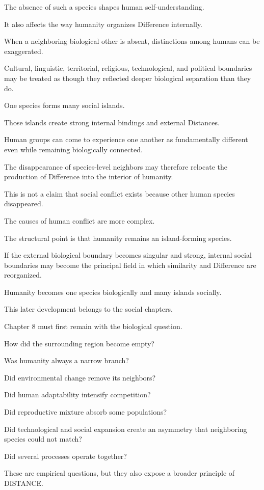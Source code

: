 The absence of such a species shapes human self-understanding.

It also affects the way humanity organizes Difference internally.

When a neighboring biological other is absent, distinctions among humans can be exaggerated.

Cultural, linguistic, territorial, religious, technological, and political boundaries may be treated as though they reflected deeper biological separation than they do.

One species forms many social islands.

Those islands create strong internal bindings and external Distances.

Human groups can come to experience one another as fundamentally different even while remaining biologically connected.

The disappearance of species-level neighbors may therefore relocate the production of Difference into the interior of humanity.

This is not a claim that social conflict exists because other human species disappeared.

The causes of human conflict are more complex.

The structural point is that humanity remains an island-forming species.

If the external biological boundary becomes singular and strong, internal social boundaries may become the principal field in which similarity and Difference are reorganized.

Humanity becomes one species biologically and many islands socially.

This later development belongs to the social chapters.

Chapter 8 must first remain with the biological question.

How did the surrounding region become empty?

Was humanity always a narrow branch?

Did environmental change remove its neighbors?

Did human adaptability intensify competition?

Did reproductive mixture absorb some populations?

Did technological and social expansion create an asymmetry that neighboring species could not match?

Did several processes operate together?

These are empirical questions, but they also expose a broader principle of DISTANCE.

